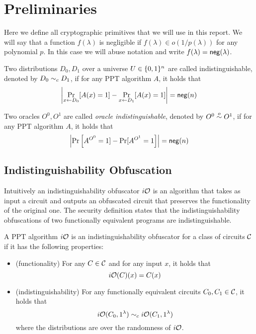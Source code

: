 \section{Preliminaries}

Here we define all cryptographic primitives that we will use in this report. We will say that a function $f(\lambda)$ is negligible if $f(\lambda)\in o(1/p(\lambda))$ for any polynomial $p$. In this case we will abuse notation and write $f(\lambda)=\mathsf{neg}(\lambda)$.

Two distributions $D_0,D_1$ over a universe $U\in\{0,1\}^n$ are called indistinguishable, denoted by $D_0\sim_c D_1$, if for any PPT algorithm $A$, it holds that
\[
\left|\Pr_{x\gets D_0}[A(x)=1]-\Pr_{x\gets D_1}[A(x)=1]\right|=\mathsf{neg}(n)
\]

Two oracles $O^0,O^1$ are called \emph{oracle indistinguishable}, denoted by $O^0\overset{o}{\sim} O^1$, if for any PPT algorithm $A$, it holds that
\[
\left|\Pr\left[A^{O^0}=1]-\Pr[A^{O^1}=1\right]\right|=\mathsf{neg}(n)
\]

\subsection{Indistinguishability Obfuscation}

Intuitively an indistinguishability obfuscator $i\mathcal{O}$ is an algorithm that takes as input a circuit and outputs an obfuscated circuit that preserves the functionality of the original one. The security definition states that the indistinguishability obfuscations of two functionally equivalent programs are indistinguishable.

\begin{mydef}
A PPT algorithm $i\mathcal{O}$ is an indistinguishability obfuscator for a class of circuits $\mathcal{C}$ if it has the following properties:
\begin{itemize}
\item (functionality) For any $C\in\mathcal{C}$ and for any input $x$, it holds that
\[
i\mathcal{O}(C)(x)=C(x)
\]
\item (indistinguishability) For any functionally equivalent circuits $C_0,C_1\in\mathcal{C}$, it holds that
\[
i\mathcal{O}(C_0,1^\lambda)\sim_c i\mathcal{O}(C_1,1^\lambda)
\]
where the distributions are over the randomness of $i\mathcal{O}$.
\end{itemize}
\end{mydef}



